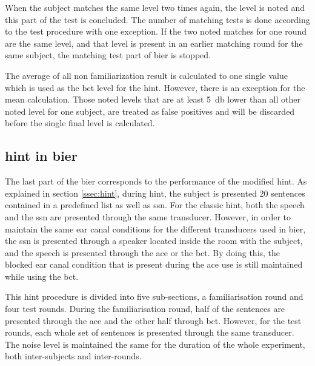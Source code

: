 When the subject matches the same level two times again, the level is noted and this part of the test is concluded. The number of matching tests is done according to the test procedure with one exception. If the two noted matches for one round are the same level, and that level is present in an earlier matching round for the same subject, the matching test part of \gls{bier} is stopped. 

The average of all non familiarization result is calculated to one single value which is used as the \gls{bct} level for the \gls{hint}. However, there is an exception for the mean calculation. Those noted levels that are at least \SI{5}{\decibel} lower than all other noted level for one subject, are treated as false positives and will be discarded before the single final level is calculated. 



\subsection{\gls{hint} in \gls{bier}}
The last part of the \gls{bier} corresponds to the performance of the modified \gls{hint}. As explained in section \autoref{ssec:hint}, during \gls{hint}, the subject is presented 20 sentences contained in a predefined list as well as \gls{ssn}. For the classic \gls{hint}, both the speech and the \gls{ssn} are presented through the same transducer. However, in order to maintain the same ear canal conditions for the different transducers used in \gls{bier}, the \gls{ssn} is presented through a speaker located inside the room with the subject, and the speech is presented through the  \gls{ace} or the \gls{bct}. By doing this, the blocked ear canal condition that is present during the \gls{ace} use is still maintained while using the \gls{bct}.

This \gls{hint} procedure is divided into five sub-sections, a familiarisation round and four test rounds. During the familiarisation round, half of the sentences are presented through the \gls{ace} and the other half through \gls{bct}. However, for the test rounds, each whole set of sentences is presented through the same transducer. The noise level is maintained the same for the duration of the whole experiment, both inter-subjects and inter-rounds.

